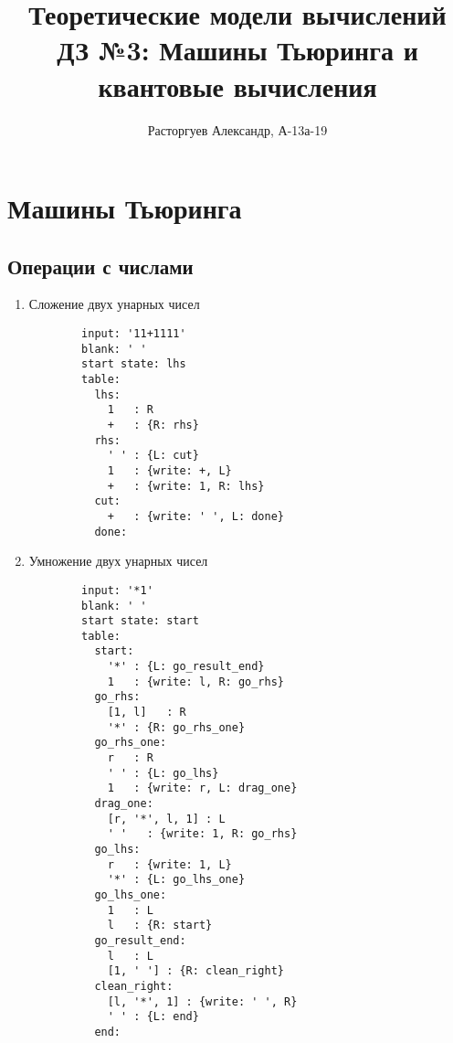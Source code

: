 \documentclass{article}
\title{\textbf{Теоретические модели вычислений \\ ДЗ №3: Машины Тьюринга и квантовые вычисления}}
\author{Расторгуев Александр, А-13а-19}
\begin{document}
\maketitle

\section{Машины Тьюринга}
\subsection{Операции с числами}
\begin{enumerate}
    \item Сложение двух унарных чисел
    \begin{verbatim}
        input: '11+1111'
        blank: ' '
        start state: lhs
        table:
          lhs:
            1   : R
            +   : {R: rhs}
          rhs:
            ' ' : {L: cut}
            1   : {write: +, L}
            +   : {write: 1, R: lhs}
          cut:
            +   : {write: ' ', L: done}
          done:
    \end{verbatim}
    \item Умножение двух унарных чисел
    \begin{verbatim}
        input: '*1'
        blank: ' '
        start state: start
        table:
          start:
            '*' : {L: go_result_end}
            1   : {write: l, R: go_rhs}
          go_rhs:
            [1, l]   : R
            '*' : {R: go_rhs_one}
          go_rhs_one:
            r   : R
            ' ' : {L: go_lhs}
            1   : {write: r, L: drag_one}
          drag_one:
            [r, '*', l, 1] : L
            ' '   : {write: 1, R: go_rhs}
          go_lhs:
            r   : {write: 1, L}
            '*' : {L: go_lhs_one}
          go_lhs_one:
            1   : L
            l   : {R: start}
          go_result_end:
            l   : L
            [1, ' '] : {R: clean_right}
          clean_right:
            [l, '*', 1] : {write: ' ', R}
            ' ' : {L: end}
          end:
    \end{verbatim}
\end{enumerate}
\end{document}
